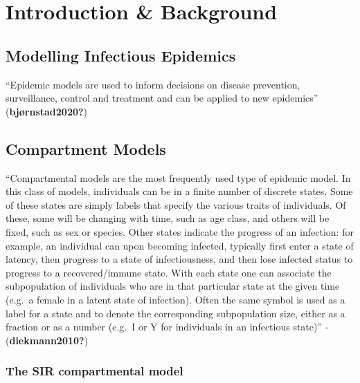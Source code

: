 \documentclass{monashthesis}
\author{}
\title{}
\begin{document}

\titlepage

{\sf\tighttoc\doublespacing}

\hypertarget{sec-intro}{%
\section{Introduction \& Background}\label{sec-intro}}

\hypertarget{modelling-infectious-epidemics}{%
\subsection{Modelling Infectious
Epidemics}\label{modelling-infectious-epidemics}}

``Epidemic models are used to inform decisions on disease prevention,
surveillance, control and treatment and can be applied to new
epidemics'' (\textbf{bjørnstad2020?})

\hypertarget{compartment-models}{%
\subsection{Compartment Models}\label{compartment-models}}

``Compartmental models are the most frequently used type of epidemic
model. In this class of models, individuals can be in a finite number of
discrete states. Some of these states are simply labels that specify the
various traits of individuals. Of these, some will be changing with
time, such as age class, and others will be fixed, such as sex or
species. Other states indicate the progress of an infection: for
example, an individual can upon becoming infected, typically first enter
a state of latency, then progress to a state of infectiousness, and then
lose infected status to progress to a recovered/immune state. With each
state one can associate the subpopulation of individuals who are in that
particular state at the given time (e.g.~a female in a latent state of
infection). Often the same symbol is used as a label for a state and to
denote the corresponding subpopulation size, either as a fraction or as
a number (e.g.~I or Y for individuals in an infectious state)'' -
(\textbf{diekmann2010?})

\hypertarget{the-sir-compartmental-model}{%
\subsubsection{The SIR compartmental
model}\label{the-sir-compartmental-model}}
\end{document}
